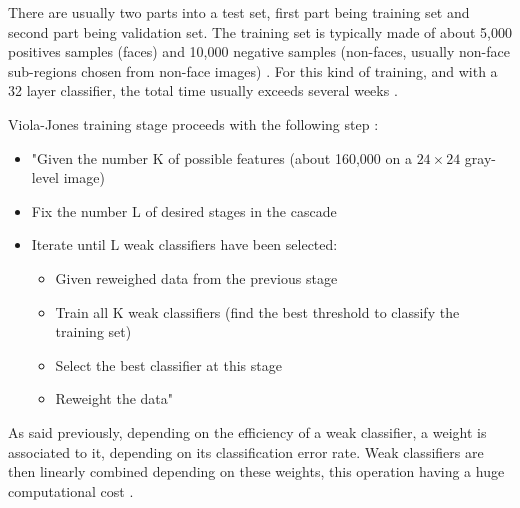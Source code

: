 \vspace{\baselineskip}
\noindent There are usually two parts into a test set, first part being training set and second part being validation set. The training set is typically made of about 5,000 positives samples (faces) and 10,000 negative samples (non-faces, usually non-face sub-regions chosen from non-face images) \cite{DIN08}. For this kind of training, and with a 32 layer classifier, the total time usually exceeds several weeks \cite{VIO01}.
\newline

\noindent Viola-Jones training stage proceeds with the following step \cite{DIN08}:

\begin{itemize}
  \item "Given the number K of possible features (about 160,000 on a $ 24\times24 $ gray-level image)
  \item Fix the number L of desired stages in the cascade
  \item Iterate until L weak classifiers have been selected:
  \begin{itemize}
  	\item Given reweighed data from the previous stage
	\item Train all K weak classifiers (find the best threshold to classify the training set)
	\item Select the best classifier at this stage
	\item Reweight the data"
  \end{itemize}
\end{itemize}

\noindent As said previously, depending on the efficiency of a weak classifier, a weight is associated to it, depending on its classification error rate. Weak classifiers are then linearly combined depending on these weights, this operation having a huge computational cost \cite{DIN08}.
\newline





